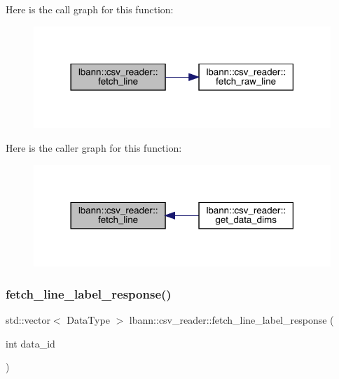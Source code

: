 Here is the call graph for this function\+:\nopagebreak
\begin{figure}[H]
\begin{center}
\leavevmode
\includegraphics[width=318pt]{classlbann_1_1csv__reader_acd3af11382da3057c3e72c46bf65f5d3_cgraph}
\end{center}
\end{figure}
Here is the caller graph for this function\+:\nopagebreak
\begin{figure}[H]
\begin{center}
\leavevmode
\includegraphics[width=318pt]{classlbann_1_1csv__reader_acd3af11382da3057c3e72c46bf65f5d3_icgraph}
\end{center}
\end{figure}
\mbox{\label{classlbann_1_1csv__reader_ae00ba61c2b9db1595ff62ab61a218cfb}} 
\subsubsection{\texorpdfstring{fetch\+\_\+line\+\_\+label\+\_\+response()}{fetch\_line\_label\_response()}}
{\footnotesize\ttfamily std\+::vector$<$ Data\+Type $>$ lbann\+::csv\+\_\+reader\+::fetch\+\_\+line\+\_\+label\+\_\+response (\begin{DoxyParamCaption}\item[{int}]{data\+\_\+id }\end{DoxyParamCaption})}

